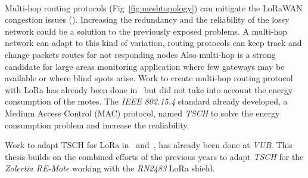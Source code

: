 


\paragraph{}

Multi-hop routing protocols (Fig~\ref{fig:meshtopology}) can mitigate
the LoRaWAN congestion issues (\cite{8115756}).
Increasing the redundancy and the reliability of the lossy network could be a
solution to the previously exposed problems.
A multi-hop network can adapt to this kind of variation, routing protocols can
keep track and change packets routes for not responding nodes
Also multi-hop is a strong candidate for large areas monitoring application
where few gateways may be available or where blind spots arise.
Work to create multi-hop routing protocol with LoRa has already been
done in~\cite{8115756} but did not take into account the energy consumption of
the motes.
The \emph{IEEE 802.15.4} standard already developed, a Medium Access Control (MAC)
protocol, named \emph{TSCH} to solve the energy consumption problem and
increase the realiability.

Work to adapt TSCH for LoRa in~\cite{8847137} and~\cite{njomgang_2018}, has
already been done at \emph{VUB}.
This thesis builds on the combined efforts of the previous
years to adapt \emph{TSCH} for the \emph{Zolertia RE-Mote} working with the
\emph{RN2483} LoRa shield.
